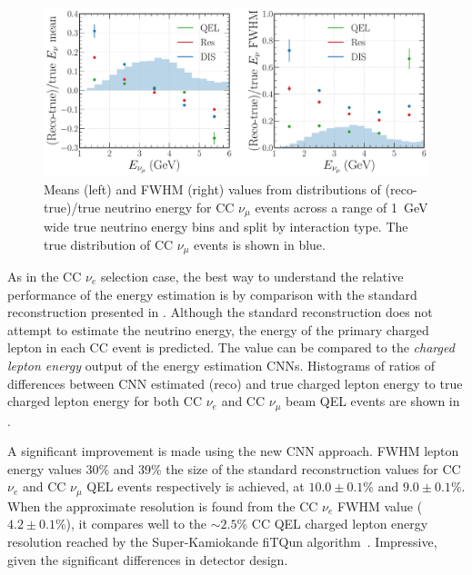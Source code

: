 \begin{figure} %
    \includegraphics[width=\textwidth]{diagrams/7-results/final_energy_numu.pdf}
    \caption[Means and FWHM values of $\nu_{\mu}$ energy distributions]
    {Means (left) and FWHM (right) values from distributions of (reco-true)/true neutrino energy
        for CC $\nu_{\mu}$ events across a range of \SI{1}{GeV} wide true neutrino energy bins and
        split by interaction type. The true distribution of CC $\nu_{\mu}$ events is shown in
        blue.}
    \label{fig:final_energy_numu}
\end{figure}

As in the CC $\nu_{e}$ selection case, the best way to understand the relative performance of the
energy estimation is by comparison with the standard \chips reconstruction presented in
. Although the standard reconstruction does not attempt to estimate
the neutrino energy, the energy of the primary charged lepton in each CC event is predicted. The
value can be compared to the \emph{charged lepton energy} output of the energy estimation CNNs.
Histograms of ratios of differences between CNN estimated (reco) and true charged lepton energy to
true charged lepton energy for both CC $\nu_{e}$ and CC $\nu_{\mu}$ beam QEL events are shown in
.

A significant improvement is made using the new CNN approach. FWHM lepton energy values 30\% and
39\% the size of the standard reconstruction values for CC $\nu_{e}$ and CC $\nu_{\mu}$ QEL events
respectively is achieved, at $10.0\pm0.1\%$ and $9.0\pm0.1\%$. When the approximate resolution is
found from the CC $\nu_{e}$ FWHM value ($4.2\pm0.1\%$), it compares well to the $\sim2.5\%$ CC QEL
charged lepton energy resolution reached by the Super-Kamiokande fiTQun
algorithm~\cite{jiang2019}. Impressive, given the significant differences in detector design.

